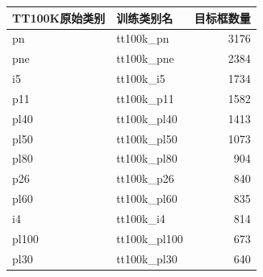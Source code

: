 \begin{tabular}{llr}
\toprule
TT100K原始类别 & 训练类别名 & 目标框数量 \\
\midrule
pn & tt100k\_pn & 3176 \\
pne & tt100k\_pne & 2384 \\
i5 & tt100k\_i5 & 1734 \\
p11 & tt100k\_p11 & 1582 \\
pl40 & tt100k\_pl40 & 1413 \\
pl50 & tt100k\_pl50 & 1073 \\
pl80 & tt100k\_pl80 & 904 \\
p26 & tt100k\_p26 & 840 \\
pl60 & tt100k\_pl60 & 835 \\
i4 & tt100k\_i4 & 814 \\
pl100 & tt100k\_pl100 & 673 \\
pl30 & tt100k\_pl30 & 640 \\
\bottomrule
\end{tabular}
